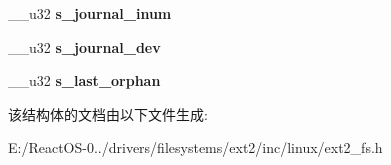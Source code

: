 \begin{DoxyCompactItemize}
\item 
\mbox{\label{structext2__super__block_a46af9db8d03e4b9ac6a0a374c7d4a0f4}} 
\+\_\+\+\_\+u32 {\bfseries s\+\_\+journal\+\_\+inum}
\item 
\mbox{\label{structext2__super__block_a4ee39eac4b4c573ac5687cbdcf4bc490}} 
\+\_\+\+\_\+u32 {\bfseries s\+\_\+journal\+\_\+dev}
\item 
\mbox{\label{structext2__super__block_a647044a92c6ea92dfb8afbbbac3547fc}} 
\+\_\+\+\_\+u32 {\bfseries s\+\_\+last\+\_\+orphan}
\end{DoxyCompactItemize}


该结构体的文档由以下文件生成\+:\begin{DoxyCompactItemize}
\item 
E\+:/\+React\+O\+S-\/0../drivers/filesystems/ext2/inc/linux/ext2\+\_\+fs.\+h\end{DoxyCompactItemize}
